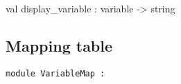 \label{val:Term.display-underscorevariable}\begin{ocamldoccode}
val display_variable : variable -> string
\end{ocamldoccode}




\subsection{Mapping table}




\begin{ocamldoccode}
{\tt{module }}{\tt{VariableMap}}{\tt{ : }}\end{ocamldoccode}
\label{module:Term.VariableMap}

